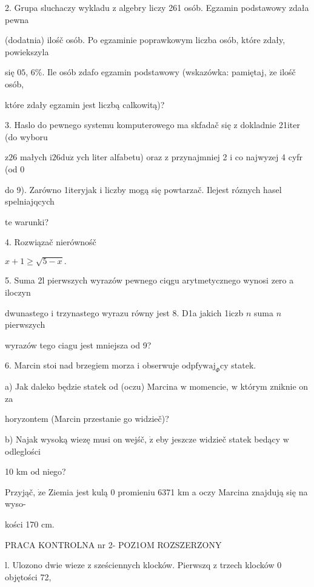 \documentclass[a4paper,12pt]{article}
\begin{document}
2. Grupa sluchaczy wykladu $\mathrm{z}$ algebry liczy 261 osób. Egzamin podstawowy zdała pewna

(dodatnia) ilośč osób. Po egzaminie poprawkowym liczba osób, które zdały, powiekszyla

się $0 5$, 6\%. Ile osób zdafo egzamin podstawowy (wskazówka: pamiętaj, $\dot{\mathrm{z}}\mathrm{e}$ ilośč osób,

które zdały egzamin jest liczbą calkowitą)?

3. Haslo do pewnego systemu komputerowego ma skfadač się $\mathrm{z}$ dokladnie 21iter (do wyboru

$\mathrm{z}26$ małych $\mathrm{i}26\mathrm{d}\mathrm{u}\dot{\mathrm{z}}$ ych liter alfabetu) oraz $\mathrm{z}$ przynajmniej 2 $\mathrm{i}$ co najwyzej 4 cyfr (od 0

do 9). Zarówno 1iteryjak $\mathrm{i}$ liczby mogą się powtarzač. Ilejest róznych hasel spelniajqcych

te warunki?

4. Rozwiązač nierównośč

$x+1\geq\sqrt{5-x}.$

5. Suma 2l pierwszych wyrazów pewnego ciqgu arytmetycznego wynosi zero a iloczyn

dwunastego $\mathrm{i}$ trzynastego wyrazu równy jest 8. D1a jakich 1iczb $n$ suma $n$ pierwszych

wyrazów tego ciagu jest mniejsza od 9?

6. Marcin stoi nad brzegiem morza $\mathrm{i}$ obserwuje $\mathrm{o}\mathrm{d}\mathrm{p}\mathrm{f}\mathrm{y}\mathrm{w}\mathrm{a}\mathrm{j}_{\Phi}\mathrm{c}\mathrm{y}$ statek.

a) Jak daleko będzie statek od (oczu) Marcina $\mathrm{w}$ momencie, $\mathrm{w}$ którym zniknie on za

horyzontem (Marcin przestanie go widzieč)?

b) Najak wysoką wiezę musi on wejśč, $\dot{\mathrm{z}}$ eby jeszcze widzieč statek bedący $\mathrm{w}$ odleglości

10 km od niego?

Przyjąč, $\dot{\mathrm{z}}\mathrm{e}$ Ziemia jest kulą $0$ promieniu 6371 km a oczy Marcina znajdują się na wyso-

kości 170 cm.




PRACA KONTROLNA nr 2- POZ1OM ROZSZERZONY

l. Ulozono dwie wieze $\mathrm{z}$ sześciennych klocków. Pierwszq $\mathrm{z}$ trzech klocków $0$ objętości 72,
\end{document}
